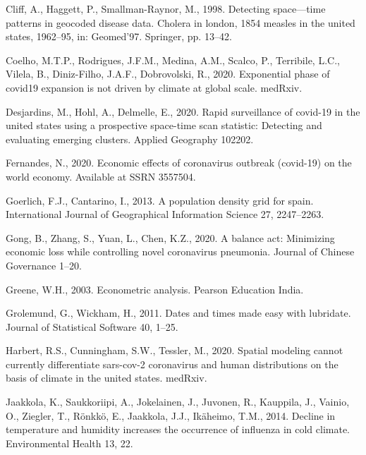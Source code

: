 \documentclass[]{elsarticle} %
\begin{document}
\leavevmode\hypertarget{ref-Cliff1998detecting}{}%
Cliff, A., Haggett, P., Smallman-Raynor, M., 1998. Detecting
space---time patterns in geocoded disease data. Cholera in london, 1854
measles in the united states, 1962--95, in: Geomed'97. Springer, pp.
13--42.

\leavevmode\hypertarget{ref-Coelho2020exponential}{}%
Coelho, M.T.P., Rodrigues, J.F.M., Medina, A.M., Scalco, P., Terribile,
L.C., Vilela, B., Diniz-Filho, J.A.F., Dobrovolski, R., 2020.
Exponential phase of covid19 expansion is not driven by climate at
global scale. medRxiv.

\leavevmode\hypertarget{ref-Desjardins2020rapid}{}%
Desjardins, M., Hohl, A., Delmelle, E., 2020. Rapid surveillance of
covid-19 in the united states using a prospective space-time scan
statistic: Detecting and evaluating emerging clusters. Applied Geography
102202.

\leavevmode\hypertarget{ref-Fernandes2020economic}{}%
Fernandes, N., 2020. Economic effects of coronavirus outbreak (covid-19)
on the world economy. Available at SSRN 3557504.

\leavevmode\hypertarget{ref-goerlich2013population}{}%
Goerlich, F.J., Cantarino, I., 2013. A population density grid for
spain. International Journal of Geographical Information Science 27,
2247--2263.

\leavevmode\hypertarget{ref-Gong2020balance}{}%
Gong, B., Zhang, S., Yuan, L., Chen, K.Z., 2020. A balance act:
Minimizing economic loss while controlling novel coronavirus pneumonia.
Journal of Chinese Governance 1--20.

\leavevmode\hypertarget{ref-Greene2003econometric}{}%
Greene, W.H., 2003. Econometric analysis. Pearson Education India.

\leavevmode\hypertarget{ref-Grolemund2011dates}{}%
Grolemund, G., Wickham, H., 2011. Dates and times made easy with
lubridate. Journal of Statistical Software 40, 1--25.

\leavevmode\hypertarget{ref-Harbert2020spatial}{}%
Harbert, R.S., Cunningham, S.W., Tessler, M., 2020. Spatial modeling
cannot currently differentiate sars-cov-2 coronavirus and human
distributions on the basis of climate in the united states. medRxiv.

\leavevmode\hypertarget{ref-Jaakkola2014decline}{}%
Jaakkola, K., Saukkoriipi, A., Jokelainen, J., Juvonen, R., Kauppila,
J., Vainio, O., Ziegler, T., Rönkkö, E., Jaakkola, J.J., Ikäheimo, T.M.,
2014. Decline in temperature and humidity increases the occurrence of
influenza in cold climate. Environmental Health 13, 22.
\end{document}
